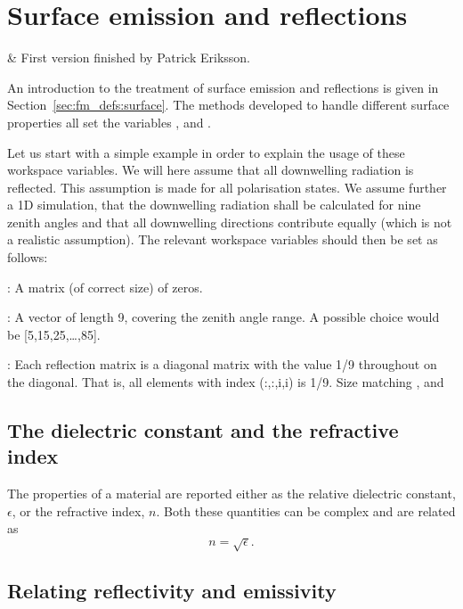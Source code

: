 \chapter{Surface emission and reflections}
 \label{sec:surface}


 & First version finished by Patrick Eriksson. \\
\stophistory

An introduction to the treatment of surface emission and reflections
is given in Section~\ref{sec:fm_defs:surface}. The methods developed
to handle different surface properties all set the variables
,  and
.

Let us start with a simple example in
order to explain the usage of these workspace variables. We will here
assume that all downwelling radiation is reflected. This assumption is
made for all polarisation states. We assume further a 1D simulation,
that the downwelling radiation shall be calculated for nine zenith
angles and that all downwelling directions contribute equally (which
is not a realistic assumption). The relevant workspace
variables should then be set as follows:
 
 : A matrix (of correct size) of zeros.

 : A vector of length 9, covering the zenith
 angle range. A possible choice would be [5,15,25,\dots,85].

 : Each reflection matrix is a diagonal
 matrix with the value 1/9 throughout on the diagonal. That is, all
 elements with index (:,:,i,i) is 1/9. Size matching
 ,  and



\section{The dielectric constant and the refractive index}
 
 The properties of a material are reported either as the relative
 dielectric constant, $\epsilon$, or the refractive index, $n$. Both
 these quantities can be complex and are related as
 \begin{equation}
   \label{eq:surface_eps2n}
   n = \sqrt{\epsilon}.
 \end{equation}


\section{Relating reflectivity and emissivity}
 \label{sec:surface:surface:ref2emi}
 
